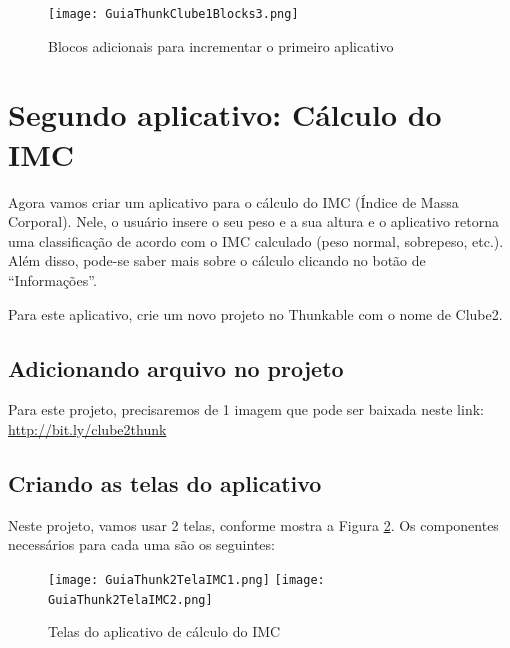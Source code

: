 \documentclass[11pt,fleqn]{book} %
\begin{document}
\begin{figure}[H]
	\centering
    \texttt{[image: GuiaThunkClube1Blocks3.png]}
    \caption{Blocos adicionais para incrementar o primeiro aplicativo}\label{fig:clube1blocks3}
    
\end{figure}


\section{Segundo aplicativo: Cálculo do IMC}

Agora vamos criar um aplicativo para o cálculo do IMC (Índice de Massa Corporal). Nele, o usuário insere o seu peso e a sua altura e o aplicativo retorna uma classificação de acordo com o IMC calculado (peso normal, sobrepeso, etc.). Além disso, pode-se saber mais sobre o cálculo clicando no botão de ``Informações''.

Para este aplicativo, crie um novo projeto no Thunkable com o nome de Clube2. 

\subsection{Adicionando arquivo no projeto}

Para este projeto, precisaremos de 1 imagem que pode ser baixada neste link:
\url{http://bit.ly/clube2thunk}


\subsection{Criando as telas do aplicativo}


Neste projeto, vamos usar 2 telas, conforme mostra a Figura \ref{fig:telasimc}. Os componentes necessários para cada uma são os seguintes:

\begin{figure}[H]
	\centering
    \texttt{[image: GuiaThunk2TelaIMC1.png]}\hspace{0.2cm}
    \texttt{[image: GuiaThunk2TelaIMC2.png]}
	\caption{Telas do aplicativo de cálculo do IMC}\label{fig:telasimc}
\end{figure}
\end{document}

